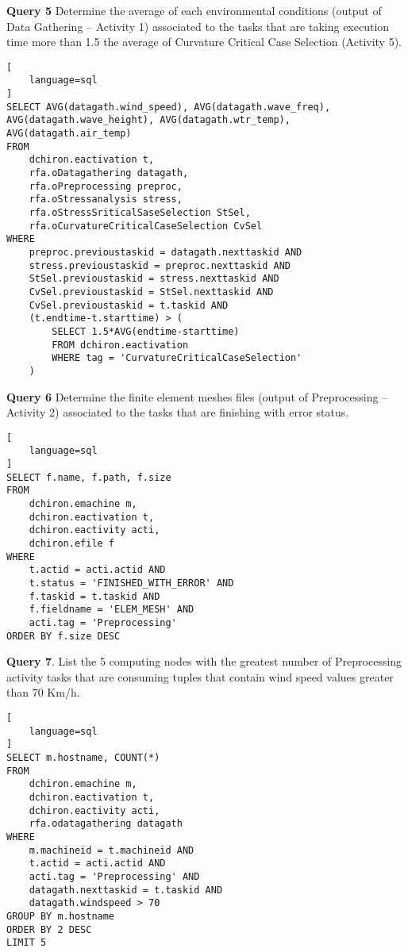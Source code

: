 \vspace{1.5em}
\noindent \textbf{Query 5}
Determine the average of each environmental conditions (output of Data Gathering – Activity 1) associated to the tasks that are taking execution time more than 1.5 the average of Curvature Critical Case Selection (Activity 5).

\noindent\begin{minipage}[t]{1.0\linewidth}
\begin{lstlisting}[
    language=sql
]
SELECT AVG(datagath.wind_speed), AVG(datagath.wave_freq), AVG(datagath.wave_height), AVG(datagath.wtr_temp), AVG(datagath.air_temp)
FROM
	dchiron.eactivation t,
	rfa.oDatagathering datagath,
	rfa.oPreprocessing preproc,
	rfa.oStressanalysis stress,
	rfa.oStressSriticalSaseSelection StSel,
	rfa.oCurvatureCriticalCaseSelection CvSel
WHERE
	preproc.previoustaskid = datagath.nexttaskid AND
	stress.previoustaskid = preproc.nexttaskid AND
	StSel.previoustaskid = stress.nexttaskid AND
	CvSel.previoustaskid = StSel.nexttaskid AND
	CvSel.previoustaskid = t.taskid AND
	(t.endtime-t.starttime) > (
		SELECT 1.5*AVG(endtime-starttime) 
		FROM dchiron.eactivation
		WHERE tag = 'CurvatureCriticalCaseSelection'
	)
\end{lstlisting}
\end{minipage}


\vspace{1.5em}
\noindent \textbf{Query 6}
Determine the finite element meshes files (output of Preprocessing – Activity 2) associated to the tasks that are finishing with error status.

\noindent\begin{minipage}[t]{1.0\linewidth}
\begin{lstlisting}[
    language=sql
]
SELECT f.name, f.path, f.size
FROM
	dchiron.emachine m,
	dchiron.eactivation t,
	dchiron.eactivity acti,
	dchiron.efile f
WHERE
	t.actid = acti.actid AND
	t.status = 'FINISHED_WITH_ERROR' AND
	f.taskid = t.taskid AND
	f.fieldname = 'ELEM_MESH' AND
	acti.tag = 'Preprocessing'
ORDER BY f.size DESC
\end{lstlisting}
\end{minipage}

\vspace{1.5em}
\noindent \textbf{Query 7}.
List the 5 computing nodes with the greatest number of Preprocessing activity tasks that are consuming tuples that contain wind speed values greater than 70 Km/h.

\noindent\begin{minipage}[t]{1.0\linewidth}
\begin{lstlisting}[
    language=sql
]
SELECT m.hostname, COUNT(*)
FROM
	dchiron.emachine m,
	dchiron.eactivation t,
	dchiron.eactivity acti,
	rfa.odatagathering datagath
WHERE
	m.machineid = t.machineid AND
	t.actid = acti.actid AND
	acti.tag = 'Preprocessing' AND
	datagath.nexttaskid = t.taskid AND
	datagath.windspeed > 70
GROUP BY m.hostname
ORDER BY 2 DESC
LIMIT 5
\end{lstlisting}
\end{minipage}

